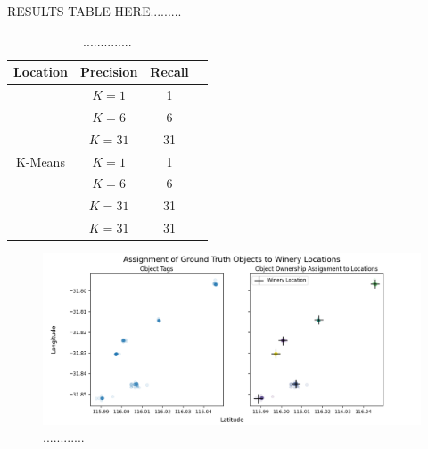 RESULTS TABLE HERE.........
\begin{table}[h!]
	\begin{center}
		\begin{tabular}{ |c|c|c|c| } 
			\hline
			Location & Precision & Recall \\
			\hline
			\multirow{7}{4em}{K-Means} 
                & $K=1$ & 1 \\ 
			& $K=6$ & 6  \\ 
			& $K=31$ & 31 \\ 
                & $K=1$ & 1 \\ 
			& $K=6$ & 6  \\ 
			& $K=31$ & 31 \\ 
   			& $K=31$ & 31 \\ 
			\hline
		\end{tabular}
		\label{table:clustering}
		\caption{..............}
	\end{center}
\end{table}


\begin{figure}[ht]
\label{fig:cmeans}        
\includegraphics[width=\textwidth]{papers/figures/gestalt_cmeans.png}
\centering
\caption[width=\textwidth]{............}
\end{figure}




